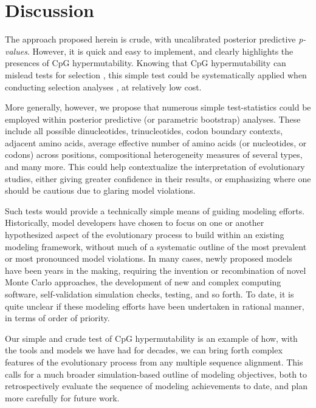 \documentclass{article}
\begin{document}
\section*{Discussion}
The approach proposed herein is crude, with uncalibrated posterior predictive \emph{p-values}.  However, it is quick and easy to implement, and clearly highlights the presences of CpG hypermutability.  Knowing that CpG hypermutability can mislead tests for selection \citep{LaurinLemay2018a,LaurinLemay2022}, this simple test could be systematically applied when conducting selection analyses \citep[e.g.,][]{Kosiol2008,Murrell2015,Davydov2019,Slodkowicz2020}, at relatively low cost.

More generally, however, we propose that numerous simple test-statistics could be employed within posterior predictive (or parametric bootstrap) analyses.  These include all possible dinucleotides, trinucleotides, codon boundary contexts, adjacent amino acids, average effective number of amino acids (or nucleotides, or codons) across positions, compositional heterogeneity measures of several types, and many more.  This could help contextualize the interpretation of evolutionary studies, either giving greater confidence in their results, or emphasizing where one should be cautious due to glaring model violations.

Such tests would provide a technically simple means of guiding modeling efforts.  Historically, model developers have chosen to focus on one or another hypothesized aspect of the evolutionary process to build within an existing modeling framework, without much of a systematic outline of the most prevalent or most pronounced model violations.  In many cases, newly proposed models have been years in the making, requiring the invention or recombination of novel Monte Carlo approaches, the development of new and complex computing software, self-validation simulation checks, testing, and so forth.  To date, it is quite unclear if these modeling efforts have been undertaken in rational manner, in terms of order of priority.

Our simple and crude test of CpG hypermutability is an example of how, with the tools and models we have had for decades, we can bring forth complex features of the evolutionary process from any multiple sequence alignment.  This calls for a much broader simulation-based outline of modeling objectives, both to retrospectively evaluate the sequence of modeling achievements to date, and plan more carefully for future work.
\end{document}
